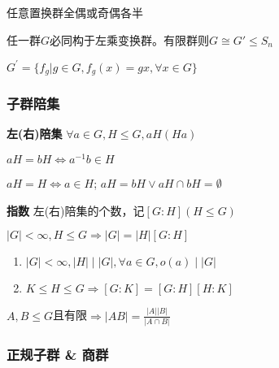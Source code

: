\documentclass[b4paper, 10pt]{ctexart}
\newcommand*{\impl}{\Rightarrow}
\renewcommand*{\iff}{\Leftrightarrow}
\renewcommand*{\leq}{\leqslant}
\begin{document}
\begin{multicols}{3}
    \begin{theorem}[置换群性质]
        任意置换群全偶或奇偶各半
    \end{theorem}

    \begin{theorem}[Cayley定理]
        任一群$G$必同构于左乘变换群。有限群则$G \!\cong\! G' \!\leq\! S_n$

        $G^{'} = \{f_g | g \in G,f_g (x)=gx,\forall x\in G\}$
    \end{theorem}

    \subsubsection{子群陪集}

    \textbf{左(右)陪集} $\forall a \!\in\! G, H \!\leq\! G, aH(Ha)$

    \begin{theorem}[陪集相等判则]
        $aH = bH \iff a^{-1}b \in H$
    \end{theorem}

    $aH=H \iff a\in H$; $aH=bH \vee aH \cap bH=\emptyset$

    \textbf{指数} 左(右)陪集的个数，记$[G\!:\!H](H \!\leq\! G)$

    \begin{theorem}[Lagrange定理]
        $|G| \!\! < \!\! \infty, H \!\!\leq\!\! G \!\!\impl\!\! |G| \!\! = \!\! |H|[G\!:\!H]$
    \end{theorem}

    \begin{theorem}[指数性质]
        \hfil

        \begin{enumerate}
            \item $|G| < \infty, |H| \mid |G|, \forall a \in G, o(a) \mid |G|$
            \item $K \!\leq\! H \!\leq\! G \!\impl\! [G\!:\!K] \! = \! [G\!:\!H][H\!:\!K]$
        \end{enumerate}
    \end{theorem}

    \begin{theorem}[子群阶]
        $A, B \!\leq\! G$且有限$\impl |AB| = \frac{ |A| |B| }{ |A \cap B| }$
    \end{theorem}

    \subsubsection{正规子群 \& 商群}


\end{multicols}
\end{document}
